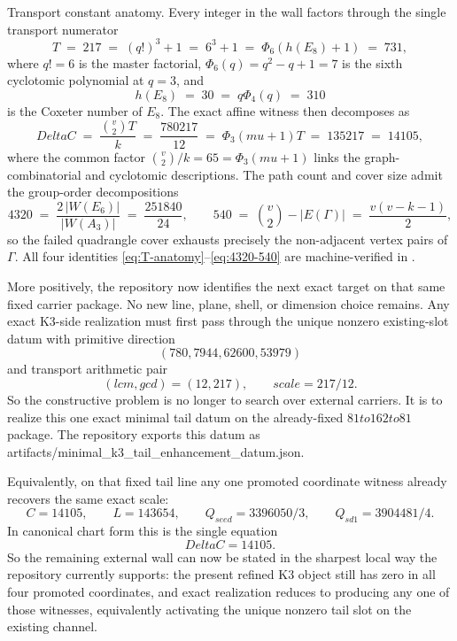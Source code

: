 \documentclass[12pt,a4paper]{article}
\def\mathrm#1{#1}%
\def\textbf#1{#1}%
\def\texttt#1{#1}%
\def\text#1{#1}%
\def\Delta{Delta}%
\def\mu{mu}%
\def\Phi#1{Phi#1}%
\def\cdot{ }%
\def\to{ to }%
\theoremstyle{definition}
\begin{document}
\medskip
\noindent\textbf{Transport constant anatomy.}\quad
Every integer in the wall factors through the single transport numerator
\begin{equation}
T \;=\; 217 \;=\; (q!)^{3}+1 \;=\; 6^{3}+1
    \;=\; \Phi_{6}\cdot(h(E_{8})+1) \;=\; 7\cdot 31,
\label{eq:T-anatomy}
\end{equation}
where $q!=6$ is the master factorial, $\Phi_{6}(q)=q^{2}-q+1=7$ is the
sixth cyclotomic polynomial at $q=3$, and
\begin{equation}
h(E_{8}) \;=\; 30 \;=\; q\cdot\Phi_{4}(q) \;=\; 3\cdot 10
\label{eq:h-E8}
\end{equation}
is the Coxeter number of $E_{8}$.  The exact affine witness then
decomposes as
\begin{equation}
\Delta C \;=\; \frac{\binom{v}{2}\cdot T}{k}
           \;=\; \frac{780\cdot 217}{12}
           \;=\; \Phi_{3}\cdot(\mu+1)\cdot T
           \;=\; 13\cdot 5\cdot 217
           \;=\; 14105,
\label{eq:dC-anatomy}
\end{equation}
where the common factor $\binom{v}{2}/k = 65 = \Phi_{3}(\mu+1)$ links
the graph-combinatorial and cyclotomic descriptions.  The path count
and cover size admit the group-order decompositions
\begin{equation}
4320 \;=\; \frac{2\,|W(E_{6})|}{|W(A_{3})|}
        \;=\; \frac{2\cdot 51840}{24},
\qquad
540 \;=\; \binom{v}{2}-|E(\Gamma)| \;=\; \frac{v(v-k-1)}{2}, %
\label{eq:4320-540}
\end{equation}
so the failed quadrangle cover exhausts precisely the non-adjacent
vertex pairs of $\Gamma$.  All four identities
\eqref{eq:T-anatomy}--\eqref{eq:4320-540} are machine-verified in
.

More positively, the repository now identifies the next exact target on
that same fixed carrier package.  No new line, plane, shell, or
dimension choice remains.  Any exact K3-side realization must first
pass through the unique nonzero existing-slot datum with primitive
direction
\[
(780,7944,62600,53979)
\]
and transport arithmetic pair
\[
(\mathrm{lcm},\mathrm{gcd})=(12,217),
\qquad
\text{scale }=217/12.
\]
So the constructive problem is no longer to search over external
carriers.  It is to realize this one exact minimal tail datum on the
already-fixed $81\to 162\to 81$ package.  The repository exports this
datum as \texttt{artifacts/minimal\_k3\_tail\_enhancement\_datum.json}.

Equivalently, on that fixed tail line any one promoted coordinate
witness already recovers the same exact scale:
\[
C=14105,
\qquad
L=143654,
\qquad
Q_{\mathrm{seed}}=3396050/3,
\qquad
Q_{\mathrm{sd1}}=3904481/4.
\]
In canonical chart form this is the single equation
\[
\Delta C = 14105.
\]
So the remaining external wall can now be stated in the sharpest local
way the repository currently supports: the present refined K3 object
still has zero in all four promoted coordinates, and exact realization
reduces to producing any one of those witnesses, equivalently
activating the unique nonzero tail slot on the existing channel.
\end{document}
